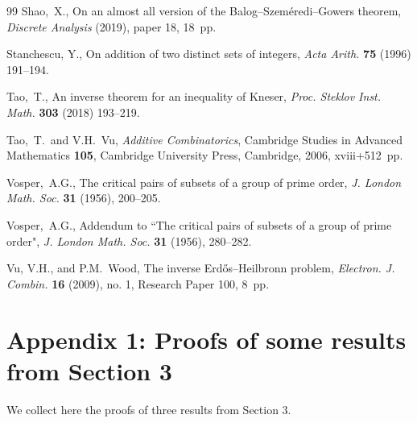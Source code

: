 \documentclass[12pt,reqno]{amsart}
\theoremstyle{definition}
\begin{document}
\begin{thebibliography}{99}
Shao,~X., On an almost all version of the Balog--Szem\'eredi--Gowers theorem, {\em Discrete Analysis} (2019),
paper 18, 18~pp.

Stanchescu, Y., On addition of two distinct sets of integers,
{\em Acta Arith.} {\bf 75} (1996) 191--194.



Tao,~T.,
An inverse theorem for an inequality of Kneser,
{\em Proc. Steklov Inst. Math.} {\bf 303} (2018)
193--219.

Tao,~T.\, and V.H.~Vu,
{\em Additive Combinatorics},
Cambridge Studies in Advanced Mathematics {\bf 105},
Cambridge University Press, Cambridge, 2006, xviii+512~pp.




Vosper,~A.G.,
The critical pairs of subsets of a group of prime order,
{\em J. London Math. Soc.} {\bf 31} (1956), 200--205.

Vosper,~A.G.,
Addendum to ``The critical pairs of subsets of a group of prime order",
{\em J. London Math. Soc.} {\bf 31} (1956), 280--282.

Vu, V.H., and P.M.~Wood, The inverse Erd\H{o}s--Heilbronn problem, {\em Electron. J. Combin.} {\bf 16} (2009), no. 1, Research Paper 100, 8~pp.



\end{thebibliography}



\section{Appendix 1: Proofs of some results from Section 3}


We collect here the proofs of three results from Section 3.
\end{document}
